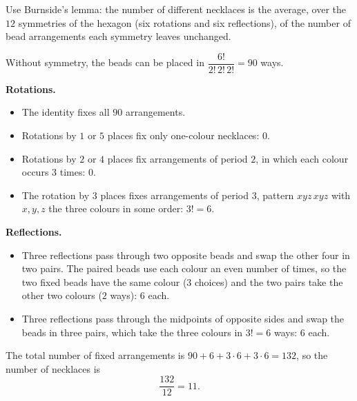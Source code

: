 Use Burnside's lemma: the number of different necklaces is the average, over the $12$ symmetries of the hexagon (six rotations and six reflections), of the number of bead arrangements each symmetry leaves unchanged.

Without symmetry, the beads can be placed in $\dfrac{6!}{2!\,2!\,2!}=90$ ways.

\textbf{Rotations.}
\begin{itemize}
\item The identity fixes all $90$ arrangements.
\item Rotations by $1$ or $5$ places fix only one-colour necklaces: $0$.
\item Rotations by $2$ or $4$ places fix arrangements of period $2$, in which each colour occurs $3$ times: $0$.
\item The rotation by $3$ places fixes arrangements of period $3$, pattern $xyz\,xyz$ with $x,y,z$ the three colours in some order: $3!=6$.
\end{itemize}

\textbf{Reflections.}
\begin{itemize}
\item Three reflections pass through two opposite beads and swap the other four in two pairs. The paired beads use each colour an even number of times, so the two fixed beads have the same colour ($3$ choices) and the two pairs take the other two colours ($2$ ways): $6$ each.
\item Three reflections pass through the midpoints of opposite sides and swap the beads in three pairs, which take the three colours in $3!=6$ ways: $6$ each.
\end{itemize}

The total number of fixed arrangements is $90+6+3\cdot6+3\cdot6=132$, so the number of necklaces is
\[
\dfrac{132}{12}=\boxed{11}.
\]
